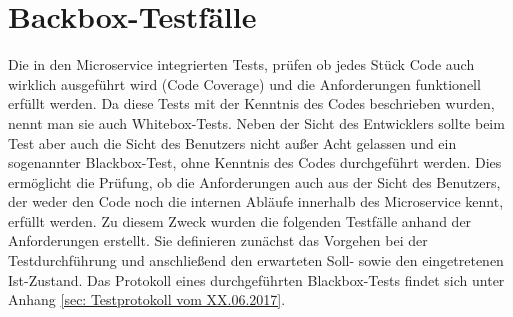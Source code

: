 \section{Backbox-Testfälle}
\label{sec: Blackbox-Testfaelle}

Die in den Microservice integrierten Tests, prüfen ob jedes Stück Code auch wirklich ausgeführt wird (Code Coverage) und die Anforderungen funktionell erfüllt werden. Da diese Tests mit der Kenntnis des Codes beschrieben wurden, nennt man sie auch Whitebox-Tests. Neben der Sicht des Entwicklers sollte beim Test aber auch die Sicht des Benutzers nicht außer Acht gelassen und ein sogenannter Blackbox-Test, ohne Kenntnis des Codes durchgeführt werden. Dies ermöglicht die Prüfung, ob die Anforderungen auch aus der Sicht des Benutzers, der weder den Code noch die internen Abläufe innerhalb des Microservice kennt, erfüllt werden. Zu diesem Zweck wurden die folgenden Testfälle anhand der Anforderungen erstellt. Sie definieren zunächst das Vorgehen bei der Testdurchführung und anschließend den erwarteten Soll- sowie den eingetretenen Ist-Zustand. Das Protokoll eines durchgeführten Blackbox-Tests findet sich unter Anhang \ref{sec: Testprotokoll vom XX.06.2017}. 


